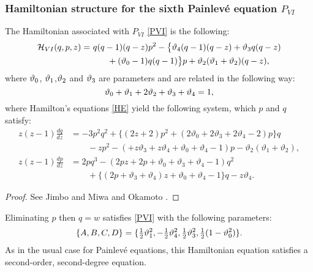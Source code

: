 \documentclass[12pt]{article}
\def\P{Painlev\'e }
\numberwithin{figure}{section}
\numberwithin{equation}{section}
\numberwithin{table}{section}
\begin{document}
\subsubsection{Hamiltonian structure for the sixth \P equation  $P_{VI}$}
The Hamiltonian associated with $P_{VI}$ \eqref{PVI} is the following:
\begin{align}\nonumber
\mathcal{H}_{VI}(q,p,z)=&~q(q-1)(q-z)p^2-\big\{\vartheta_4(q-1)(q-z)+\vartheta_3q(q-z)\\&\qquad+(\vartheta_0-1)q(q-1)\big\}p+\vartheta_2(\vartheta_1+\vartheta_2)(q-z),\label{HVI}
\end{align}
where $\vartheta_0$, $\vartheta_1$,$\vartheta_2$ and $\vartheta_3$ are parameters and are related in the following way:
$$\vartheta_0+\vartheta_1+2\vartheta_2+\vartheta_3+\vartheta_4=1,$$
where Hamilton's equations \eqref{HE} yield the following system, which $p$ and $q$ satisfy:
\begin{subequations}\label{HVISYS}
\begin{align}\nonumber
z(z-1)\frac{dq}{dz}&=-3{p}^{2}{q}^{2}+ \big\{( 2z+2) {p}^{2}+(2
\vartheta_{{0}}+2\vartheta_{{3}}+2\vartheta_{{4}}-2) p \big\} q\\ &\qquad-z{p
}^{2}- \left( +z\vartheta_{{3}}+z\vartheta_{{4}}+\vartheta_{{0}}+\vartheta_{{4}}-1
 \right) p-\vartheta_{{2}} \left( \vartheta_{{1}}+\vartheta_{{2}} \right),\label{HVI2}\\\nonumber
z(z-1)\frac{dp}{dz}&=2p{q}^{3}- \left( 2pz+2p+\vartheta_{{0}}+\vartheta_{{3}}+\vartheta_{{4}}
-1 \right) {q}^{2}\\ &\qquad+ \big\{(2p+\vartheta_{{3}}+\vartheta_{{4}}) z+\vartheta_{{0}}+\vartheta_{{4}}-1 \big\} q-z\vartheta_{{4}}
.\label{HVI1}
\end{align}
\end{subequations}
\begin{proof}
See Jimbo and Miwa \cite{P:2:407} and Okamoto \cite{P:56:264,P:56:367,P:13:47}.
\end{proof}
Eliminating $p$ then $q=w$ satisfies \eqref{PVI} with the following parameters:
$$\{A,B,C,D\}=\{\tfrac{1}{2}\vartheta_1^2,-\tfrac{1}{2}\vartheta_4^2,\tfrac{1}{2}\vartheta_3^2,\tfrac{1}{2}(1-\vartheta_0^2)\}.$$
As in the usual case for \P equations, this Hamiltonian equation satisfies a second-order, second-degree equation.
\end{document}

